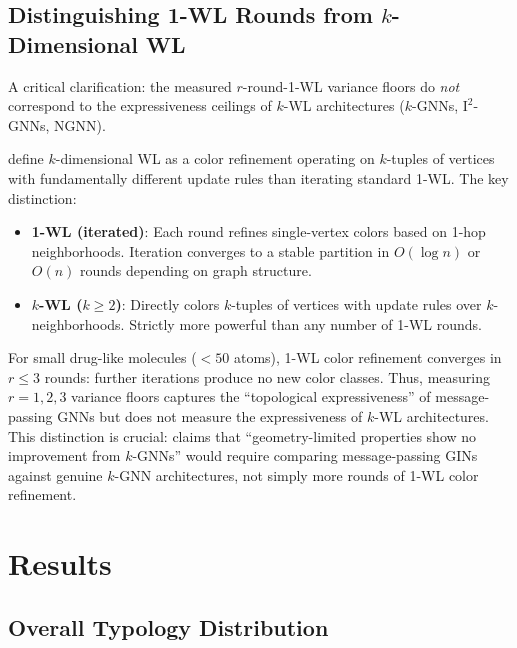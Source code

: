 \documentclass[11pt,letterpaper]{article}
\begin{document}
\subsection{Distinguishing 1-WL Rounds from \texorpdfstring{$k$}{k}-Dimensional WL}

A critical clarification: the measured $r$-round-1-WL variance floors do \emph{not} correspond to the expressiveness ceilings of $k$-WL architectures ($k$-GNNs, $\mathrm{I}^2$-GNNs, NGNN).

\citet{Maron2019} define $k$-dimensional WL as a color refinement operating on $k$-tuples of vertices with fundamentally different update rules than iterating standard 1-WL. The key distinction:
\begin{itemize}
  \item \textbf{1-WL (iterated)}: Each round refines single-vertex colors based on 1-hop neighborhoods. Iteration converges to a stable partition in $O(\log n)$ or $O(n)$ rounds depending on graph structure.
  \item \textbf{$k$-WL ($k \geq 2$)}: Directly colors $k$-tuples of vertices with update rules over $k$-neighborhoods. Strictly more powerful than any number of 1-WL rounds.
\end{itemize}
For small drug-like molecules ($<50$ atoms), 1-WL color refinement converges in $r \leq 3$ rounds: further iterations produce no new color classes. Thus, measuring $r=1, 2, 3$ variance floors captures the ``topological expressiveness'' of message-passing GNNs but does not measure the expressiveness of $k$-WL architectures. This distinction is crucial: claims that ``geometry-limited properties show no improvement from $k$-GNNs'' would require comparing message-passing GINs against genuine $k$-GNN architectures, not simply more rounds of 1-WL color refinement.

\section{Results}

\subsection{Overall Typology Distribution}
\end{document}

